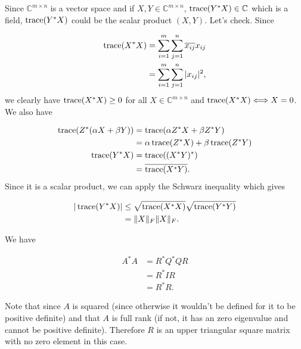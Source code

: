 \begin{solution}
  Since $\mathbb{C}^{m \times n}$ is a vector space and if $X,Y \in \mathbb{C}^{m \times n}$, $\operatorname{trace}(Y^*X) \in \mathbb{C}$ which is a field,
  $\operatorname{trace}(Y^*X)$ could be the scalar product $(X,Y)$.
  Let's check.
  Since

  \begin{align*}
    \operatorname{trace}(X^*X)
    & = \sum_{i = 1}^m \sum_{j = 1}^n \overline{x_{ij}}x_{ij}\\
    & = \sum_{i = 1}^m \sum_{j = 1}^n |x_{ij}|^2,
  \end{align*}
  we clearly have $\operatorname{trace}(X^*X) \geq 0$ for all $X \in \mathbb{C}^{m \times n}$ and
  $\operatorname{trace}(X^*X) \Longleftrightarrow X = 0$.
  We also have

  \begin{align*}
    \operatorname{trace}(Z^*(\alpha X + \beta Y))
    & = \operatorname{trace}(\alpha Z^*X + \beta Z^*Y)\\
    & = \alpha\operatorname{trace}(Z^*X) + \beta\operatorname{trace}(Z^*Y)\\
    \operatorname{trace}(Y^*X)
    & = \operatorname{trace}((X^*Y)^*)\\
    & = \overline{\operatorname{trace}(X^*Y)}.
  \end{align*}
  Since it is a scalar product, we can apply the Schwarz inequality which gives

  \begin{align*}
    |\operatorname{trace}(Y^*X)|
    & \leq \sqrt{\operatorname{trace}(X^*X)} \sqrt{\operatorname{trace}(Y^*Y)}\\
    & = \|X\|_F \|X\|_F.
  \end{align*}
\end{solution}

\begin{solution}
  We have

  \begin{align*}
    A^*A
    & = R^*Q^*QR\\
    & = R^*IR\\
    & = R^*R.
  \end{align*}

  Note that since $A$ is squared
  (since otherwise it wouldn't be defined for it to be positive definite)
  and that $A$ is full rank (if not, it has an zero eigenvalue and cannot be positive definite).
  Therefore $R$ is an upper triangular square matrix with no zero element in this case.
\end{solution}


